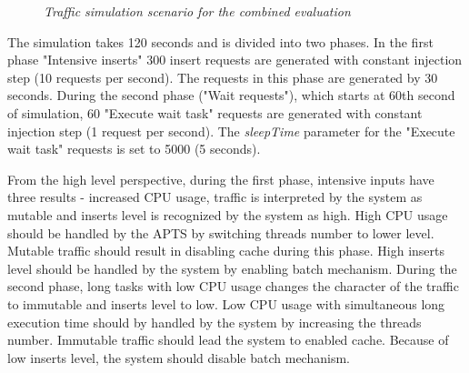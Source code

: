 \documentclass[12pt,a4paper]{article}
\begin{document}
\begin{figure}[!htb]
\begin{center}
\caption{\textit{Traffic simulation scenario for the combined evaluation}} \label{figure:trafficcombined}
\end{center}
\end{figure}

The simulation takes 120 seconds and is divided into two phases. In the first phase "Intensive inserts" 300 insert requests are generated with constant injection step (10 requests per second). The requests in this phase are generated by 30 seconds. During the second phase ("Wait requests"), which starts at 60th second of simulation, 60 "Execute wait task" requests are generated with constant injection step (1 request per second). The \textit{sleepTime} parameter for the "Execute wait task" requests is set to 5000 (5 seconds).

From the high level perspective, during the first phase, intensive inputs have three results - increased CPU usage, traffic is interpreted by the system as mutable and inserts level is recognized by the system as high.  High CPU usage should be handled by the APTS by switching threads number to lower level. Mutable traffic should result in disabling cache during this phase. High inserts level should be handled by the system by enabling batch mechanism. During the second phase, long tasks with low CPU usage changes the character of the traffic to immutable and inserts level to low. Low CPU usage with simultaneous long execution time should by handled by the system by increasing the threads number. Immutable traffic should lead the system to enabled cache. Because of low inserts level, the system should disable batch mechanism. 
\end{document}

